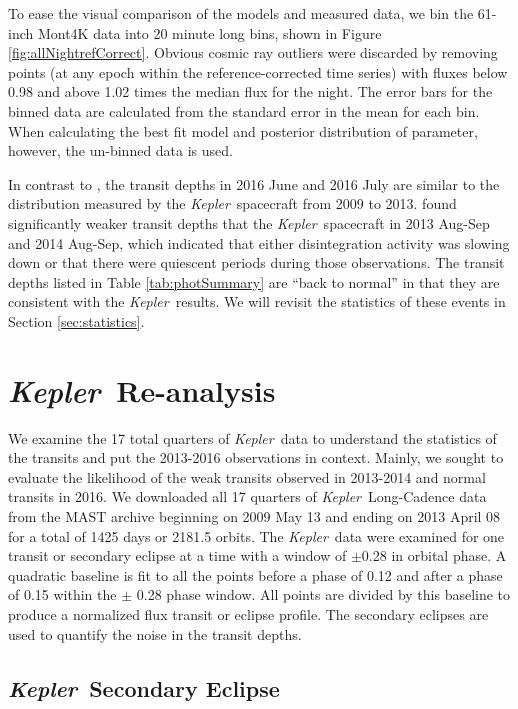 \documentclass[preprint]{aastex61}
\newcommand{\kepler}{{\it Kepler}}
\begin{document}
To ease the visual comparison of the models and measured data, we bin the 61-inch Mont4K data into 20 minute long bins, shown in Figure \ref{fig:allNightrefCorrect}.
Obvious cosmic ray outliers were discarded by removing points (at any epoch within the reference-corrected time series) with fluxes below 0.98 and above 1.02 times the median flux for the night.
The error bars for the binned data are calculated from the standard error in the mean for each bin.
When calculating the best fit model and posterior distribution of parameter, however, the un-binned data is used.

In contrast to \citet{schlawin2016kic1255}, the transit depths in 2016 June and 2016 July are similar to the distribution measured by the \kepler\ spacecraft from 2009 to 2013.
\citet{schlawin2016kic1255} found significantly weaker transit depths that the \kepler\ spacecraft in 2013 Aug-Sep and 2014 Aug-Sep, which indicated that either disintegration activity was slowing down or that there were quiescent periods during those observations.
The transit depths listed in Table \ref{tab:photSummary} are ``back to normal'' in that they are consistent with the \kepler\ results.
We will revisit the statistics of these events in Section \ref{sec:statistics}.

\section{\kepler\ Re-analysis}\label{sec:Kepler}

We examine the 17 total quarters of \kepler\ data to understand the statistics of the transits and put the 2013-2016 observations in context. Mainly, we sought to evaluate the likelihood of the weak transits observed in 2013-2014 and normal transits in 2016.
We downloaded all 17 quarters of \kepler\ Long-Cadence data from the MAST archive beginning on 2009 May 13 and ending on 2013 April 08 for a total of 1425 days or 2181.5 orbits.
The \kepler\ data were examined for one transit or secondary eclipse at a time with a window of $\pm$0.28 in orbital phase.
A quadratic baseline is fit to all the points before a phase of 0.12 and after a phase of 0.15 within the $\pm$ 0.28 phase window.
All points are divided by this baseline to produce a normalized flux transit or eclipse profile.
The secondary eclipses are used to quantify the noise in the transit depths.

\subsection{\kepler\ Secondary Eclipse}
\end{document}
